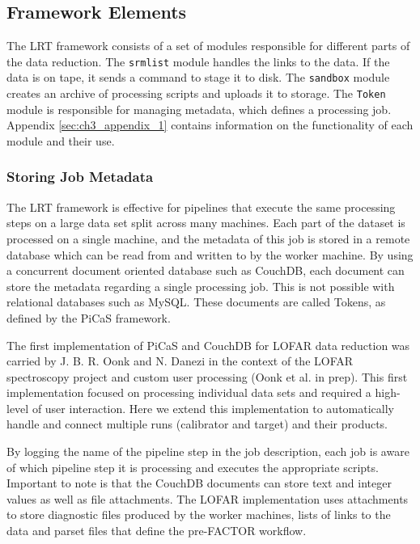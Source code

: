 \subsection{Framework Elements}
The LRT framework consists of a set of modules responsible for different parts of the data reduction. The \verb|srmlist| module handles the links to the data. If the data is on tape, it sends a command to stage it to disk. The \verb|sandbox| module creates an archive of processing scripts and uploads it to storage. The \verb|Token| module is responsible for managing metadata, which defines a processing job. Appendix \ref{sec:ch3_appendix_1} contains information on the functionality of each module and their use. 

\subsubsection{Storing Job Metadata}

The LRT framework is effective for pipelines that execute the same processing steps on a large data set split across many machines. Each part of the dataset is processed on a single machine, and the metadata of this job is stored in a remote database which can be read from and written to by the worker machine. By using a concurrent document oriented database such as CouchDB\cite{couchdb}, each document can store the metadata regarding a single processing job. This is not possible with relational databases such as MySQL.  These documents are called Tokens, as defined by the PiCaS framework\cite{picas}.

The first implementation of PiCaS and CouchDB for LOFAR data reduction was carried by J. B. R. Oonk and N. Danezi in the context of the LOFAR spectroscopy project and custom user processing (Oonk et al. in prep). This first implementation focused on processing individual data sets and required a high-level of user interaction. Here we extend this implementation to automatically handle and connect multiple runs (calibrator and target) and their products.


By logging the name of the pipeline step in the job description, each job is aware of which pipeline step it is processing and executes the appropriate scripts. Important to note is that the CouchDB documents can store text and integer values as well as file attachments. The LOFAR implementation uses attachments to store diagnostic files produced by the worker machines, lists of links to the data and parset files that define the pre-FACTOR workflow. 

